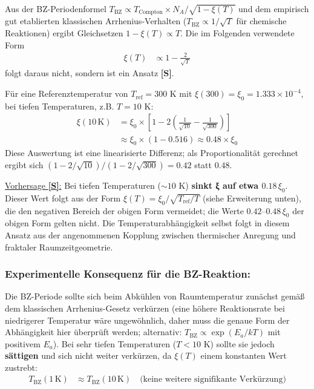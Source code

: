 Aus der BZ-Periodenformel $T_{\text{BZ}} \propto T_{\text{Compton}} \times N_A / \sqrt{1 - \xi(T)}$ und dem empirisch gut etablierten klassischen Arrhenius-Verhalten ($T_{\text{BZ}} \propto 1/\sqrt{T}$ für chemische Reaktionen) ergibt Gleichsetzen $1-\xi(T) \propto T$. Die im Folgenden verwendete Form
\begin{align*}
	\xi(T) &\propto 1 - \frac{2}{\sqrt{T}}
\end{align*}
folgt daraus nicht, sondern ist ein Ansatz \textbf{[S]}.

Für eine Referenztemperatur von $T_{\text{ref}} = 300$ K mit $\xi(300) = \xi_0 = 1.333 \times 10^{-4}$, bei tiefen Temperaturen, z.B. $T = 10$ K:
\begin{align*}
	\xi(10 \, \text{K}) &= \xi_0 \times \left[1 - 2\left(\frac{1}{\sqrt{10}} - \frac{1}{\sqrt{300}}\right)\right] \\
	&\approx \xi_0 \times (1 - 0.516) \approx 0.48 \times \xi_0
\end{align*}
Diese Auswertung ist eine linearisierte Differenz; als Proportionalität gerechnet ergibt sich $(1-2/\sqrt{10})/(1-2/\sqrt{300}) = 0.42$ statt $0.48$.

\underline{Vorhersage \textbf{[S]}:} Bei tiefen Temperaturen ($\sim 10$ K) \textbf{sinkt ξ auf etwa $0.18\,\xi_0$}. Dieser Wert folgt aus der Form $\xi(T) = \xi_0/\sqrt{T_{\text{ref}}/T}$ (siehe Erweiterung unten), die den negativen Bereich der obigen Form vermeidet; die Werte $0.42$--$0.48\,\xi_0$ der obigen Form gelten nicht. Die Temperaturabhängigkeit selbst folgt in diesem Ansatz aus der angenommenen Kopplung zwischen thermischer Anregung und fraktaler Raumzeitgeometrie.

\subsubsection*{Experimentelle Konsequenz für die BZ-Reaktion:}

Die BZ-Periode sollte sich beim Abkühlen von Raumtemperatur zunächst gemäß dem klassischen Arrhenius-Gesetz verkürzen (eine höhere Reaktionsrate bei niedrigerer Temperatur wäre ungewöhnlich, daher muss die genaue Form der Abhängigkeit hier überprüft werden; alternativ: $T_{\text{BZ}} \propto \exp(E_a/kT)$ mit positivem $E_a$). Bei sehr tiefen Temperaturen ($T < 10$ K) sollte sie jedoch \textbf{sättigen} und sich nicht weiter verkürzen, da $\xi(T)$ einem konstanten Wert zustrebt:
\begin{align*}
	T_{\text{BZ}}(1 \, \text{K}) &\approx T_{\text{BZ}}(10 \, \text{K}) \quad \text{(keine weitere signifikante Verkürzung)}
\end{align*}


